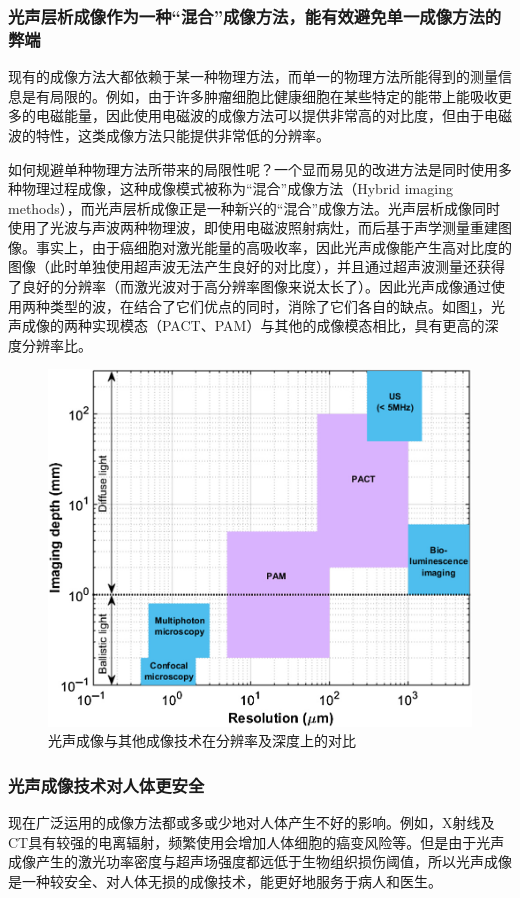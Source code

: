 \subsubsection{光声层析成像作为一种“混合”成像方法，能有效避免单一成像方法的弊端}
现有的成像方法大都依赖于某一种物理方法，而单一的物理方法所能得到的测量信息是有局限的。例如，由于许多肿瘤细胞比健康细胞在某些特定的能带上能吸收更多的电磁能量，因此使用电磁波的成像方法可以提供非常高的对比度，但由于电磁波的特性，这类成像方法只能提供非常低的分辨率。

如何规避单种物理方法所带来的局限性呢？一个显而易见的改进方法是同时使用多种物理过程成像，这种成像模式被称为“混合”成像方法（Hybrid imaging methods），而光声层析成像正是一种新兴的“混合”成像方法。光声层析成像同时使用了光波与声波两种物理波，即使用电磁波照射病灶，而后基于声学测量重建图像。事实上，由于癌细胞对激光能量的高吸收率，因此光声成像能产生高对比度的图像（此时单独使用超声波无法产生良好的对比度），并且通过超声波测量还获得了良好的分辨率（而激光波对于高分辨率图像来说太长了）。因此光声成像通过使用两种类型的波，在结合了它们优点的同时，消除了它们各自的缺点。如图\ref{img101}，光声成像的两种实现模态（PACT、PAM）与其他的成像模态相比，具有更高的深度分辨率比。

\begin{figure}[h]
	\centering
	\includegraphics[width=0.5\columnwidth]{image/chap01/img_1_01.png}
	\caption{光声成像与其他成像技术在分辨率及深度上的对比\cite{brunker2017photoacoustic}}
	\label{img101}
\end{figure}

\subsubsection{光声成像技术对人体更安全}
现在广泛运用的成像方法都或多或少地对人体产生不好的影响。例如，X射线及CT具有较强的电离辐射，频繁使用会增加人体细胞的癌变风险等。但是由于光声成像产生的激光功率密度与超声场强度都远低于生物组织损伤阈值，所以光声成像是一种较安全、对人体无损的成像技术，能更好地服务于病人和医生。

